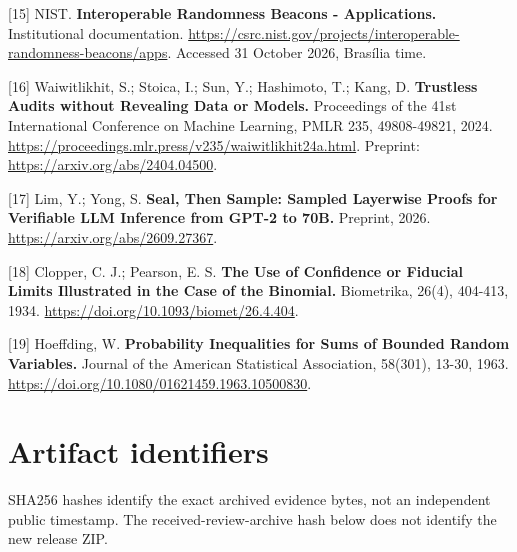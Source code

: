 \documentclass[
  10pt,
]{article}
\let\oldsection\section
\renewcommand{\section}{\needspace{5\baselineskip}\oldsection}
\begin{document}
{[}15{]} NIST. \textbf{Interoperable Randomness Beacons - Applications.}
Institutional documentation.
\url{https://csrc.nist.gov/projects/interoperable-randomness-beacons/apps}.
Accessed 31 October 2026, Brasília time.

{[}16{]} Waiwitlikhit, S.; Stoica, I.; Sun, Y.; Hashimoto, T.; Kang, D.
\textbf{Trustless Audits without Revealing Data or Models.} Proceedings
of the 41st International Conference on Machine Learning, PMLR 235,
49808-49821, 2024.
\url{https://proceedings.mlr.press/v235/waiwitlikhit24a.html}. Preprint:
\url{https://arxiv.org/abs/2404.04500}.

{[}17{]} Lim, Y.; Yong, S. \textbf{Seal, Then Sample: Sampled Layerwise
Proofs for Verifiable LLM Inference from GPT-2 to 70B.} Preprint, 2026.
\url{https://arxiv.org/abs/2609.27367}.

{[}18{]} Clopper, C. J.; Pearson, E. S. \textbf{The Use of Confidence or
Fiducial Limits Illustrated in the Case of the Binomial.} Biometrika,
26(4), 404-413, 1934. \url{https://doi.org/10.1093/biomet/26.4.404}.

{[}19{]} Hoeffding, W. \textbf{Probability Inequalities for Sums of
Bounded Random Variables.} Journal of the American Statistical
Association, 58(301), 13-30, 1963.
\url{https://doi.org/10.1080/01621459.1963.10500830}.

\appendix

\hypertarget{artifact-identifiers}{%
\section{Artifact identifiers}\label{artifact-identifiers}}

SHA256 hashes identify the exact archived evidence bytes, not an
independent public timestamp. The received-review-archive hash below
does not identify the new release ZIP.
\end{document}
